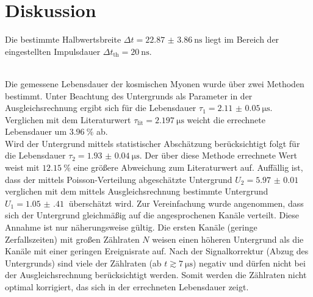 \section{Diskussion}
\label{sec:Diskussion}
Die bestimmte Halbwertsbreite $\Delta t = \qty{22.87(386)}{\nano\second}$ liegt im Bereich der eingestellten Impulsdauer $\Delta t_\text{th} = \qty{20}{\nano\second}$.

\\
Die gemessene Lebensdauer der kosmischen Myonen wurde über zwei Methoden bestimmt.
Unter Beachtung des Untergrunds als Parameter in der Ausgleichsrechnung ergibt sich für die Lebensdauer $\tau_1 = \qty{2.11(5)}{\micro\second}$.
Verglichen mit dem Literaturwert $\tau_\text{lit} = \qty{2.197}{\micro\second}$\cite{pdg} weicht die errechnete Lebensdauer um $\qty{3.96}{\percent}$ ab.
\\
Wird der Untergrund mittels statistischer Abschätzung berücksichtigt folgt für die Lebensdauer $\tau_2 = \qty{1.93(4)}{\micro\second}$.
Der über diese Methode errechnete Wert weist mit $\qty{12.15}{\percent}$ eine größere Abweichung zum Literaturwert auf.
Auffällig ist, dass der mittels Poisson-Verteilung abgeschätzte Untergrund $U_2 = \qty{5.97(1)}{}$ verglichen mit dem mittels Ausgleichsrechnung bestimmte Untergrund $U_1 = \qty{1.05(41)}{}$ überschätzt wird.
Zur Vereinfachung wurde angenommen, dass sich der Untergrund gleichmäßig auf die angesprochenen Kanäle verteilt.
Diese Annahme ist nur näherungsweise gültig.
Die ersten Kanäle (geringe Zerfallszeiten) mit großen Zählraten $N$ weisen einen höheren Untergrund als die Kanäle mit einer geringen Ereignisrate auf.
Nach der Signalkorrektur (Abzug des Untergrunds) sind viele der Zählraten (ab $t \gtrsim \qty{7}{\micro\second}$) negativ und dürfen nicht bei der Ausgleichsrechnung berücksichtigt werden.
Somit werden die Zählraten nicht optimal korrigiert, das sich in der errechneten Lebensdauer zeigt.